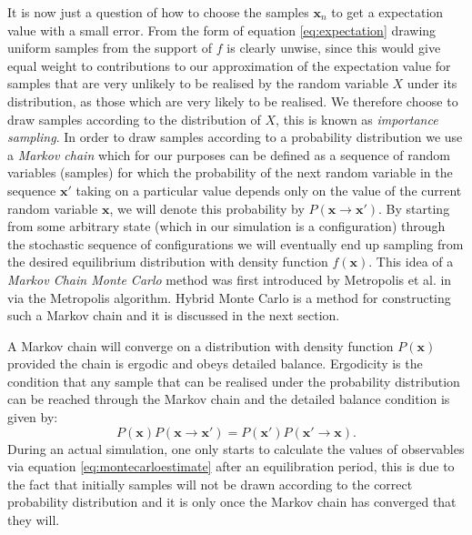 \documentclass[12pt]{article}
\begin{document}
    It is now just a question of how to choose the samples $\bm{x}_n$ to get a expectation value with a small error. From the form of equation \ref{eq:expectation} drawing uniform samples from the support of $f$ is clearly unwise, since this would give equal weight to contributions to our approximation of the expectation value for samples that are very unlikely to be realised by the random variable $X$ under its distribution, as those which are very likely to be realised. We therefore choose to draw samples according to the distribution of $X$, this is known as \textit{importance sampling}. In order to draw samples according to a probability distribution we use a \textit{Markov chain} which for our purposes can be defined as a sequence of random variables (samples) for which the probability of the next random variable in the sequence $\bm{x}'$ taking on a particular value depends only on the value of the current random variable $\bm{x}$, we will denote this probability by $P\left(\bm{x}\rightarrow \bm{x}'\right)$. By starting from some arbitrary state (which in our simulation is a configuration) through the stochastic sequence of configurations we will eventually end up sampling from the desired equilibrium distribution with density function $f\left(\bm{x}\right)$. This idea of a \textit{Markov Chain Monte Carlo} method was first introduced by Metropolis et al. in \cite{metropolis_rosenbluth_rosenbluth_teller_teller_1953} via the Metropolis algorithm. Hybrid Monte Carlo is a method for constructing such a Markov chain and it is discussed in the next section. 

    A Markov chain will converge on a distribution with density function $P\left(\bm{x}\right)$ provided the chain is ergodic and obeys detailed balance. Ergodicity is the condition that any sample that can be realised under the probability distribution can be reached through the Markov chain and the detailed balance condition is given by: 
    \begin{equation}
        \label{eq:detailedbalance}
        P\left(\bm{x}\right)P\left(\bm{x}\rightarrow \bm{x}'\right)=P\left(\bm{x}'\right)P\left(\bm{x}'\rightarrow \bm{x}\right).
    \end{equation}
    During an actual simulation, one only starts to calculate the values of observables via equation \ref{eq:montecarloestimate} after an equilibration period, this is due to the fact that initially samples will not be drawn according to the correct probability distribution and it is only once the Markov chain has converged that they will. 
\end{document}
